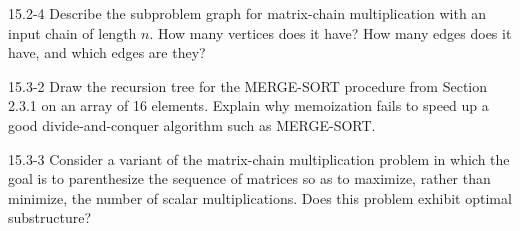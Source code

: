 \begin{problem}{15.2-4}
  Describe the subproblem graph for matrix-chain multiplication with an input chain of length $n$. How many vertices
  does it have? How many edges does it have, and which edges are they?
\end{problem}

\begin{problem}{15.3-2}
  Draw the recursion tree for the MERGE-SORT procedure from Section 2.3.1 on an array of 16 elements. Explain why
  memoization fails to speed up a good divide-and-conquer algorithm such as MERGE-SORT.
\end{problem}

\begin{problem}{15.3-3}
  Consider a variant of the matrix-chain multiplication problem in which the goal is to parenthesize the sequence of
  matrices so as to maximize, rather than minimize, the number of scalar multiplications. Does this problem exhibit
  optimal substructure?
\end{problem}


